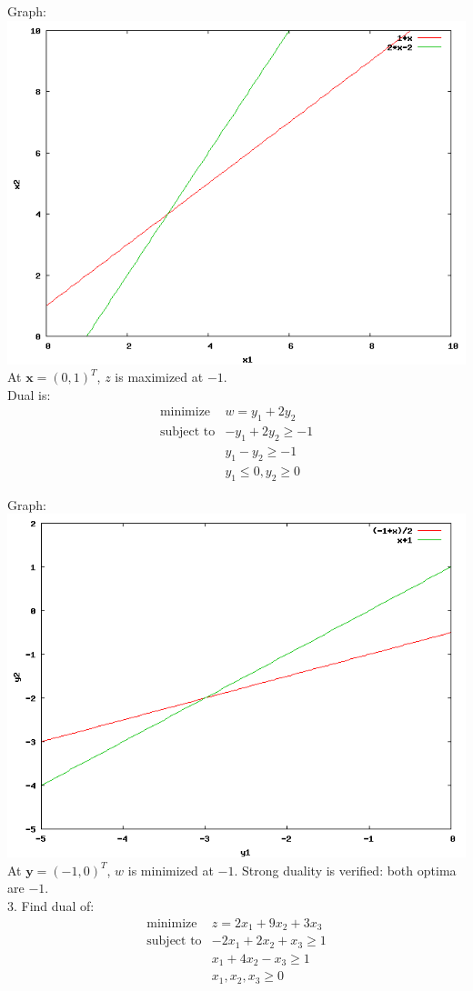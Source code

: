 \documentclass{article}
\begin{document}
Graph: \\
\includegraphics[width=0.5\linewidth]{2b} \\
At $\mathbf{x} = (0, 1)^T$, $z$ is maximized at $-1$. \\

Dual is: \\
\begin{displaymath}
\begin{array}{ll}
\textrm{minimize} & w = y_1 + 2y_2 \\
\textrm{subject to} & -y_1 + 2y_2 \ge -1 \\
& y_1 - y_2 \ge -1 \\
& y_1 \le 0, y_2 \ge 0
\end{array}
\end{displaymath}

Graph: \\
\includegraphics[width=0.5\linewidth]{2a} \\
At $\mathbf{y} = (-1, 0)^T$, $w$ is minimized at $-1$. Strong duality is verified: both optima are $-1$. \\

3. Find dual of: \\
\begin{displaymath}
\begin{array}{ll}
\textrm{minimize} & z = 2x_1 + 9x_2 + 3x_3 \\
\textrm{subject to} & -2x_1 + 2x_2 + x_3 \ge 1 \\
& x_1 + 4x_2 - x_3 \ge 1 \\
& x_1, x_2, x_3 \ge 0
\end{array}
\end{displaymath}
\end{document}
